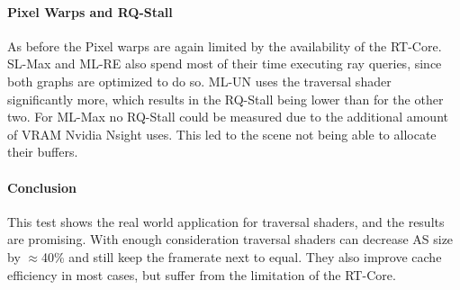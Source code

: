 \paragraph{Pixel Warps and RQ-Stall}
As before the Pixel warps are again limited by the availability of the RT-Core. SL-Max and ML-RE also spend most of their time executing ray queries, since both graphs are optimized to do so. ML-UN uses the traversal shader significantly more, which results in the RQ-Stall being lower than for the other two. For ML-Max no RQ-Stall could be measured due to the additional amount of VRAM Nvidia Nsight uses. This led to the scene not being able to allocate their buffers.
\paragraph{Conclusion}
This test shows the real world application for traversal shaders, and the results are promising. With enough consideration traversal shaders can decrease AS size by $\approx$40\% and still keep the framerate next to equal. They also improve cache efficiency in most cases, but suffer from the limitation of the RT-Core.

